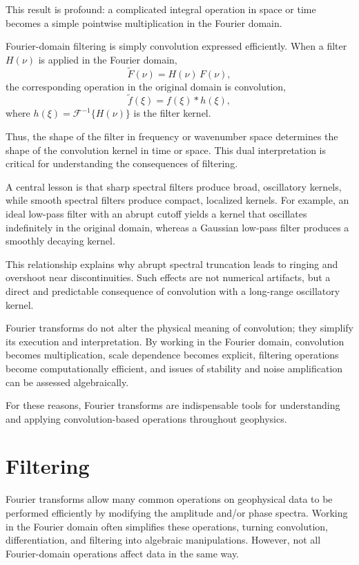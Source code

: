 This result is profound: a complicated integral operation in space or time becomes a simple pointwise multiplication in the Fourier domain.

Fourier-domain filtering is simply convolution expressed efficiently. When a filter $H(\nu)$ is applied in the Fourier domain,
\[
    \tilde{F}(\nu) = H(\nu)\,F(\nu),
\]
the corresponding operation in the original domain is convolution,
\[
    \tilde{f}(\xi) = f(\xi) * h(\xi),
\]
where $h(\xi) = \mathcal{F}^{-1}\{H(\nu)\}$ is the filter kernel.

Thus, the shape of the filter in frequency or wavenumber space determines the shape of the convolution kernel in time or space. This dual interpretation is critical for understanding the consequences of filtering.

A central lesson is that sharp spectral filters produce broad, oscillatory kernels, while smooth spectral filters produce compact, localized kernels. For example, an ideal low-pass filter with an abrupt cutoff yields a kernel that oscillates indefinitely in the original domain, whereas a Gaussian low-pass filter produces a smoothly decaying kernel.

This relationship explains why abrupt spectral truncation leads to ringing and overshoot near discontinuities. Such effects are not numerical artifacts, but a direct and predictable consequence of convolution with a long-range oscillatory kernel.

Fourier transforms do not alter the physical meaning of convolution; they simplify its execution and interpretation. By working in the Fourier domain, convolution becomes multiplication, scale dependence becomes explicit, filtering operations become computationally efficient, and issues of stability and noise amplification can be assessed algebraically.

For these reasons, Fourier transforms are indispensable tools for understanding and applying convolution-based operations throughout geophysics.


\section{Filtering}

Fourier transforms allow many common operations on geophysical data to be performed efficiently by modifying the amplitude and/or phase spectra. Working in the Fourier domain often simplifies these operations, turning convolution, differentiation, and filtering into algebraic manipulations. However, not all Fourier-domain operations affect data in the same way.

